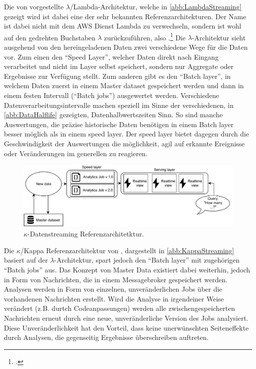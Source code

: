 Die von \citeauthor{Marz.2015} vorgestellte $\lambda$/Lambda-Architektur, welche in \autoref{abb:LambdaStreaming} gezeigt wird ist dabei eine der sehr bekannten Referenzarchitekturen. Der Name ist dabei nicht mit dem \ac{AWS} Dienst Lambda zu verwechseln, sondern ist wohl auf den gedrehten Buchstaben $\lambda$ zurückzuführen, also .\footcite[Vgl. auch im Folgenden][]{Berle.27.11.2017} Die $\lambda$-Architektur sieht ausgehend von den hereingeladenen Daten zwei verschiedene Wege für die Daten vor. Zum einen den \enquote{Speed Layer}, welcher Daten direkt nach Eingang verarbeitet und nicht im Layer selbst speichert, sondern nur Aggregate oder Ergebnisse zur Verfügung stellt. Zum anderen gibt es den \enquote{Batch layer}, in welchem Daten zuerst in einem Master dataset gespeichert werden und dann in einem festen Intervall (\enquote{Batch jobs}) ausgewertet werden. Verschiedene Datenverarbeitungsintervalle machen speziell im Sinne der verschiedenen, in \autoref{abb:DataHalflife} gezeigten, Datenhalbwertszeiten Sinn. So sind manche Auswertungen, die präzise historische Daten benötigen in einem Batch layer besser möglich als in einem speed layer. Der speed layer bietet dagegen durch die Geschwindigkeit der Auswertungen die möglichkeit, agil auf erkannte Ereignisse oder Veränderungen im generellen zu reagieren.


\begin{figure}[H]
\centering
\includegraphics[width=\textwidth]{graphics/Kappa-Reference-Architecture.pdf}
\caption[$\kappa$-Datenstreaming Referenzarchitetktur]{$\kappa$-Datenstreaming Referenzarchitetktur.\footnotemark}
\label{abb:KappaStreaming}
\end{figure}

Die $\kappa$/Kappa Referenzarchitektur von \citeauthor{Kreps.2014}, dargestellt in \autoref{abb:KappaStreaming} basiert auf der $\lambda$-Architektur, spart jedoch den \enquote{Batch layer} mit zugehörigen \enquote{Batch jobs} aus. Das Konzept von Master Data existiert dabei weiterhin, jedoch in Form von Nachrichten, die in einem Messagebroker gespeichert werden. Analysen werden in Form von einzelnen, unveränderlichen Jobs über die vorhandenen Nachrichten erstellt. Wird die Analyse in irgendeiner Weise verändert (z.B. durtch Codeanpassungen) werden alle zwischengespeicherten Nachrichten erneut durch eine neue, unveränderliche Version des Jobs analysiert. Diese Unveränderlichkeit hat den Vorteil, dass keine unerwünschten Seiteneffekte durch Analysen, die gegenseitig Ergebnisse überschreiben auftreten. 

